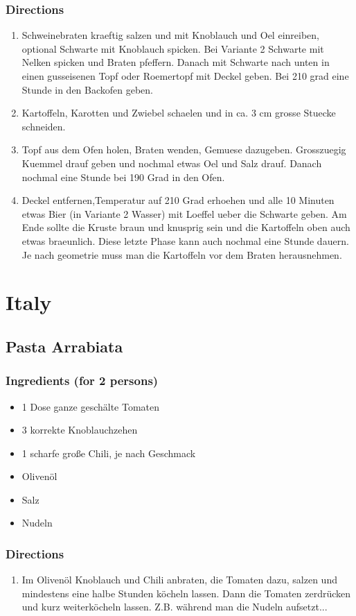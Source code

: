 \subsubsection*{Directions}
\begin{enumerate}
\item Schweinebraten kraeftig salzen und mit Knoblauch und Oel einreiben, optional Schwarte mit Knoblauch spicken. Bei Variante 2 Schwarte mit Nelken spicken und Braten pfeffern. Danach mit Schwarte nach unten in einen gusseisenen Topf oder Roemertopf mit Deckel geben. Bei 210 grad eine Stunde in den Backofen geben.
\item Kartoffeln, Karotten und Zwiebel schaelen und in ca. 3 cm grosse Stuecke schneiden.
\item Topf aus dem Ofen holen, Braten wenden, Gemuese dazugeben. Grosszuegig Kuemmel drauf geben und nochmal etwas Oel und Salz drauf. Danach nochmal eine Stunde bei 190 Grad in den Ofen.
\item Deckel entfernen,Temperatur auf 210 Grad erhoehen und alle 10 Minuten etwas Bier (in Variante 2 Wasser) mit Loeffel ueber die Schwarte geben. Am Ende sollte die Kruste braun und knusprig sein und die Kartoffeln oben auch etwas braeunlich. Diese letzte Phase kann auch nochmal eine Stunde dauern. Je nach geometrie muss man die Kartoffeln vor dem Braten herausnehmen.
\end{enumerate}
\pagebreak


\section{Italy}
\subsection{Pasta Arrabiata}
\subsubsection*{Ingredients (for 2 persons)}
\begin{itemize}
\item[] 1 Dose ganze geschälte Tomaten 
\item[] 3 korrekte Knoblauchzehen 
\item[] 1 scharfe große Chili, je nach Geschmack 
\item[] Olivenöl 
\item[] Salz
\item[] Nudeln
\end{itemize}
\subsubsection*{Directions}
\begin{enumerate}
\item Im Olivenöl Knoblauch und Chili anbraten, die Tomaten dazu, salzen und mindestens eine halbe Stunden köcheln lassen. Dann die Tomaten zerdrücken und kurz weiterköcheln lassen. Z.B. während man die Nudeln aufsetzt... 
\end{enumerate}
\pagebreak

